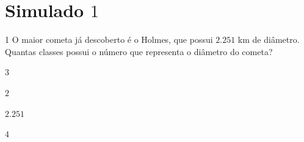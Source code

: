 

\section*{Simulado $1$}

\num{1}  O maior cometa já descoberto é o Holmes, que possui $2.251$ km de
diâmetro. Quantas classes possui o número que representa o diâmetro do cometa?

\begin{escolha}
\item $3$
\item $2$
\item $2.251$
\item $4$
\end{escolha}



